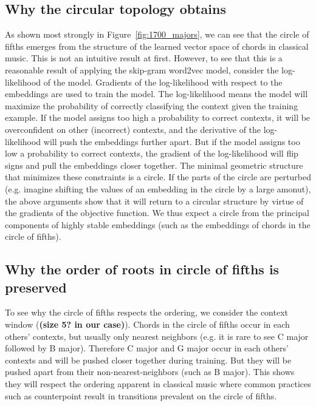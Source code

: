 
\subsection{Why the circular topology obtains}
As shown most strongly in Figure~\ref{fig:1700_majors}, we can see that the circle of fifths emerges from the structure of the learned vector space of chords in classical music.
This is not an intuitive result at first.
However, to see that this is a reasonable result of applying the skip-gram word2vec model, consider the log-likelihood of the model.
Gradients of the log-likelihood with respect to the embeddings are used to train the model.
The log-likelihood means the model will maximize the probability of correctly classifying the context given the training example.
If the model assigns too high a probability to correct contexts, it will be overconfident on other (incorrect) contexts, and the derivative of the log-likelihood will push the embeddings further apart.
But if the model assigns too low a probability to correct contexts, the gradient of the log-likelihood will flip signs and pull the embeddings closer together.
The minimal geometric structure that minimizes these constraints is a circle. If the parts of the circle are perturbed (e.g. imagine shifting the values of an embedding in the circle by a large amonut), the above arguments show that it will return to a circular structure by virtue of the gradients of the objective function.
We thus expect a circle from the principal components of highly stable embeddings (such as the embeddings of chords in the circle of fifths).

\subsection{Why the order of roots in circle of fifths is preserved}
To see why the circle of fifths respects the ordering, we consider the context window (\textbf{(size 5? in our case)}).
Chords in the circle of fifths occur in each others' contexts, but usually only nearest neighbors (e.g. it is rare to see C major followed by B major).
Therefore C major and G major occur in each others' contexts and will be pushed closer together during training.
But they will be pushed apart from their non-nearest-neighbors (such as B major). This shows they will respect the ordering apparent in classical music where common practices such as counterpoint result in transitions prevalent on the circle of fifths.

